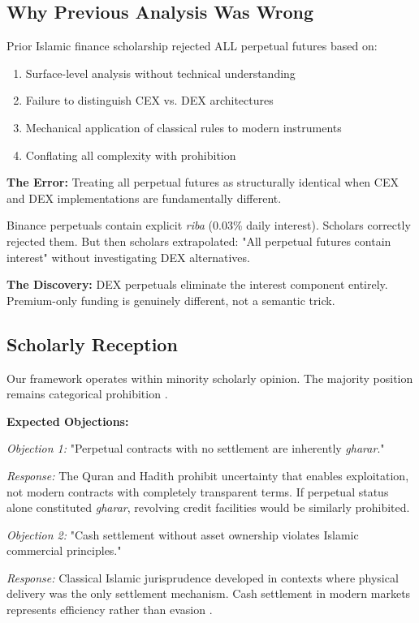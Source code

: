 \documentclass[10pt,twocolumn]{article}
\begin{document}
\subsection{Why Previous Analysis Was Wrong}

Prior Islamic finance scholarship rejected ALL perpetual futures based on:
\begin{enumerate}
    \item Surface-level analysis without technical understanding
    \item Failure to distinguish CEX vs. DEX architectures
    \item Mechanical application of classical rules to modern instruments
    \item Conflating all complexity with prohibition
\end{enumerate}

\textbf{The Error:} Treating all perpetual futures as structurally identical when CEX and DEX implementations are fundamentally different.

Binance perpetuals contain explicit \textit{riba} (0.03\% daily interest). Scholars correctly rejected them. But then scholars extrapolated: "All perpetual futures contain interest" without investigating DEX alternatives.

\textbf{The Discovery:} DEX perpetuals eliminate the interest component entirely. Premium-only funding is genuinely different, not a semantic trick.

\subsection{Scholarly Reception}

Our framework operates within minority scholarly opinion. The majority position remains categorical prohibition \citep{Musaffa2024, PracticalIF2023}.

\textbf{Expected Objections:}

\textit{Objection 1:} "Perpetual contracts with no settlement are inherently \textit{gharar}."

\textit{Response:} The Quran and Hadith prohibit uncertainty that enables exploitation, not modern contracts with completely transparent terms. If perpetual status alone constituted \textit{gharar}, revolving credit facilities would be similarly prohibited.

\textit{Objection 2:} "Cash settlement without asset ownership violates Islamic commercial principles."

\textit{Response:} Classical Islamic jurisprudence developed in contexts where physical delivery was the only settlement mechanism. Cash settlement in modern markets represents efficiency rather than evasion \citep{Kamali2000}.
\end{document}

